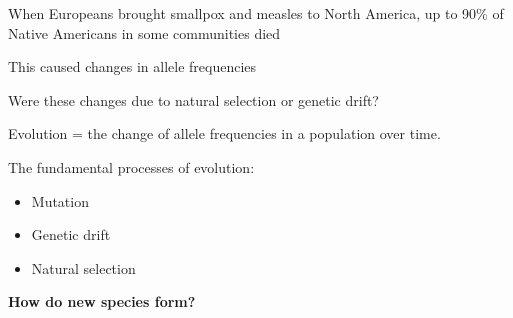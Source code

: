 \begin{frame}
\begin{adjustwidth}{-1.5em}{-1.5em}
    When Europeans brought smallpox and measles to North America, up to 90\% of
    Native Americans in some communities died

    \vspace{1cm}
    This caused changes in allele frequencies

    \vspace{1cm}
    Were these changes due to natural selection or genetic drift?
\end{adjustwidth}
\end{frame}


\begin{frame}
\begin{adjustwidth}{-1.5em}{-1.5em}
    Evolution = the change of allele frequencies in a population over time.

    \vspace{5mm}
    The fundamental processes of evolution:
    \begin{itemize}
        \item Mutation
        \item Genetic drift
        \item Natural selection
    \end{itemize}



\end{adjustwidth}
\end{frame}

\begin{frame}
    \begin{center}
        {\LARGE\bf How do new species form?}
    \end{center}
\end{frame}

